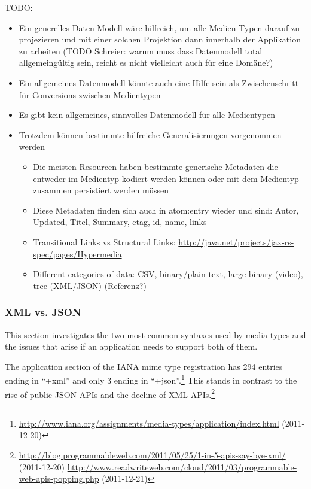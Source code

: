 \documentclass[12pt,a4paper]{scrartcl}		%
\newcommand{\citeurl}[2]{\url{#1} (#2)}
\begin{document}
TODO:
\begin{itemize}
\item Ein generelles Daten Modell wäre hilfreich, um alle Medien Typen darauf zu projezieren und mit einer solchen Projektion dann innerhalb der Applikation zu arbeiten (TODO Schreier: warum muss dass Datenmodell total allgemeingültig sein, reicht es nicht vielleicht auch für eine Domäne?)
\item Ein allgemeines Datenmodell könnte auch eine Hilfe sein als Zwischenschritt für Conversions zwischen Medientypen
\item Es gibt kein allgemeines, sinnvolles Datenmodell für alle Medientypen
\item Trotzdem können bestimmte hilfreiche Generalisierungen vorgenommen werden
  \begin{itemize}
  \item Die meisten Resourcen haben bestimmte generische Metadaten die entweder im Medientyp kodiert werden können oder mit dem Medientyp zusammen persistiert werden müssen
  \item Diese Metadaten finden sich auch in atom:entry wieder und sind: Autor, Updated, Titel, Summary, etag, id, name, links
  \item Transitional Links vs Structural Links: \url{http://java.net/projects/jax-rs-spec/pages/Hypermedia}
  \item Different categories of data: CSV, binary/plain text, large binary (video), tree (XML/JSON) (Referenz?)


  \end{itemize}
\end{itemize}

\subsubsection{XML vs. JSON}


This section investigates the two most common syntaxes used by media types
and the issues that arise if an application needs to support both of them.

The application section of the IANA mime type registration has 294 entries
ending in ``+xml'' and only 3 ending in
``+json''.\footnote{\citeurl{http://www.iana.org/assignments/media-types/application/index.html}{2011-12-20}}
This stands in contrast to the rise of public JSON APIs and the decline of XML
APIs.\footnote{\citeurl{http://blog.programmableweb.com/2011/05/25/1-in-5-apis-say-bye-xml/}{2011-12-20} \citeurl{http://www.readwriteweb.com/cloud/2011/03/programmable-web-apis-popping.php}{2011-12-21}}
\end{document}
